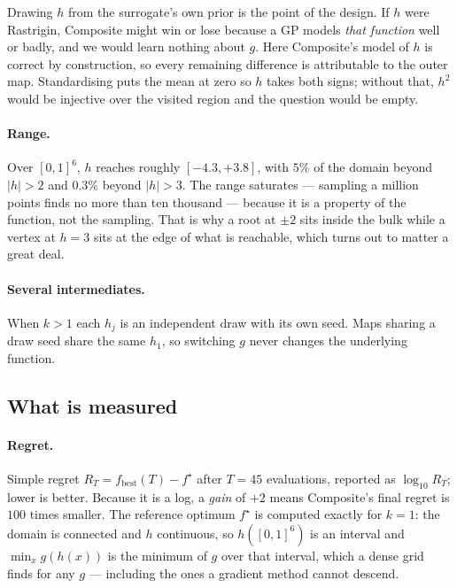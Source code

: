 \documentclass[11pt]{article}
\begin{document}
Drawing $h$ from the surrogate's own prior is the point of the design. If $h$
were Rastrigin, Composite might win or lose because a GP models \emph{that
function} well or badly, and we would learn nothing about $g$. Here
Composite's model of $h$ is correct by construction, so every remaining
difference is attributable to the outer map. Standardising puts the mean at
zero so $h$ takes both signs; without that, $h^2$ would be injective over the
visited region and the question would be empty.

\paragraph{Range.} Over $[0,1]^6$, $h$ reaches roughly $[-4.3,+3.8]$, with
$5\%$ of the domain beyond $|h|>2$ and $0.3\%$ beyond $|h|>3$. The range
saturates --- sampling a million points finds no more than ten thousand ---
because it is a property of the function, not the sampling. That is why a root
at $\pm2$ sits inside the bulk while a vertex at $h=3$ sits at the edge of what
is reachable, which turns out to matter a great deal.

\paragraph{Several intermediates.} When $k>1$ each $h_j$ is an independent
draw with its own seed. Maps sharing a draw seed share the same $h_1$, so
switching $g$ never changes the underlying function.

\subsection{What is measured}

\paragraph{Regret.} Simple regret $R_T=f_{\text{best}}(T)-f^\star$ after
$T=45$ evaluations, reported as $\log_{10}R_T$; lower is better. Because it is
a log, a \emph{gain} of $+2$ means Composite's final regret is $100$ times
smaller. The reference optimum $f^\star$ is computed exactly for $k=1$: the
domain is connected and $h$ continuous, so $h([0,1]^6)$ is an interval and
$\min_x g(h(x))$ is the minimum of $g$ over that interval, which a dense grid
finds for any $g$ --- including the ones a gradient method cannot descend.
\end{document}
